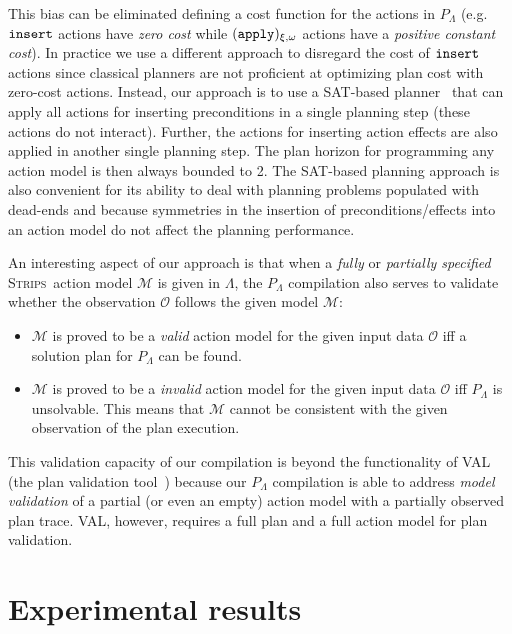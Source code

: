 \documentclass[runningheads]{llncs}
\newcommand{\strips}{\textsc{Strips}}     %
\begin{document}
This bias can be eliminated defining a cost function for the actions in $P_{\Lambda}$ (e.g. ${\tt \small insert}$ actions have {\em zero cost} while ${\tt \small (apply)_{\xi,\omega}}$ actions have a {\em positive constant cost}). In practice we use a different approach to disregard the cost of ${\tt \small insert}$ actions since classical planners are not proficient at optimizing plan cost with zero-cost actions. Instead, our approach is to use a SAT-based planner~\cite{rintanen2014madagascar} that can apply all actions for inserting preconditions in a single planning step (these actions do not interact). Further, the actions for inserting action effects are also applied in another single planning step. The plan horizon for programming any action model is then always bounded to 2. The SAT-based planning approach is also convenient for its ability to deal with planning problems populated with dead-ends and because symmetries in the insertion of preconditions/effects into an action model do not affect the planning performance.

An interesting aspect of our approach is that when a {\em fully} or {\em partially specified} \strips\ action model $\mathcal{M}$ is given in $\Lambda$, the $P_{\Lambda}$ compilation also serves to validate whether the observation $\mathcal{O}$ follows the given model $\mathcal{M}$:
\begin{itemize}
	\item $\mathcal{M}$ is proved to be a {\em valid} action model for the given input data $\mathcal{O}$ iff a solution plan for $P_{\Lambda}$ can be found.
	\item $\mathcal{M}$ is proved to be a {\em invalid} action model for the given input data $\mathcal{O}$ iff $P_{\Lambda}$ is unsolvable. This means that $\mathcal{M}$ cannot be consistent with the given observation of the plan execution.
\end{itemize}
This validation capacity of our compilation is beyond the functionality of VAL (the plan validation tool~\cite{howey2004val}) because our $P_{\Lambda}$ compilation is able to address {\em model validation} of a partial (or even an empty) action model with a partially observed plan trace. VAL, however, requires a full plan and a full action model for plan validation.


\section{Experimental results}
\end{document}
